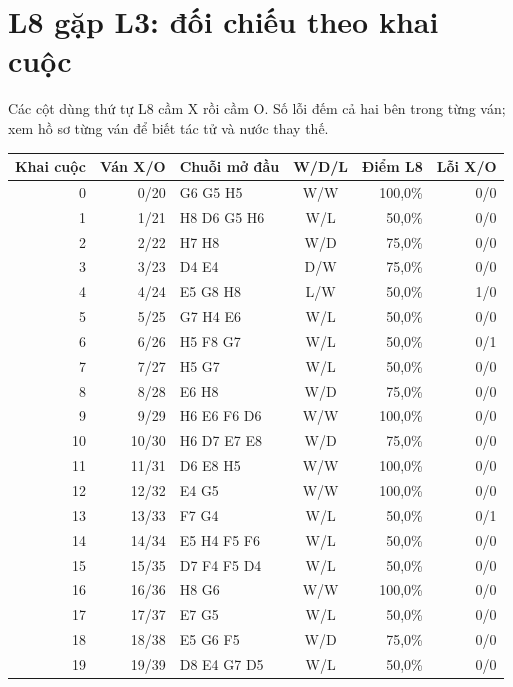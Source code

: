 \section{L8 gặp L3: đối chiếu theo khai cuộc}
Các cột dùng thứ tự L8 cầm X rồi cầm O. Số lỗi đếm cả hai bên trong từng ván; xem hồ sơ từng ván để biết tác tử và nước thay thế.
\begin{center}\small
\begin{tabular}{@{}rrlcrr@{}}
\toprule
Khai cuộc & Ván X/O & Chuỗi mở đầu & W/D/L & Điểm L8 & Lỗi X/O \\
\midrule
0 & 0/20 & G6 G5 H5 & W/W & 100,0\% & 0/0 \\
1 & 1/21 & H8 D6 G5 H6 & W/L & 50,0\% & 0/0 \\
2 & 2/22 & H7 H8 & W/D & 75,0\% & 0/0 \\
3 & 3/23 & D4 E4 & D/W & 75,0\% & 0/0 \\
4 & 4/24 & E5 G8 H8 & L/W & 50,0\% & 1/0 \\
5 & 5/25 & G7 H4 E6 & W/L & 50,0\% & 0/0 \\
6 & 6/26 & H5 F8 G7 & W/L & 50,0\% & 0/1 \\
7 & 7/27 & H5 G7 & W/L & 50,0\% & 0/0 \\
8 & 8/28 & E6 H8 & W/D & 75,0\% & 0/0 \\
9 & 9/29 & H6 E6 F6 D6 & W/W & 100,0\% & 0/0 \\
10 & 10/30 & H6 D7 E7 E8 & W/D & 75,0\% & 0/0 \\
11 & 11/31 & D6 E8 H5 & W/W & 100,0\% & 0/0 \\
12 & 12/32 & E4 G5 & W/W & 100,0\% & 0/0 \\
13 & 13/33 & F7 G4 & W/L & 50,0\% & 0/1 \\
14 & 14/34 & E5 H4 F5 F6 & W/L & 50,0\% & 0/0 \\
15 & 15/35 & D7 F4 F5 D4 & W/L & 50,0\% & 0/0 \\
16 & 16/36 & H8 G6 & W/W & 100,0\% & 0/0 \\
17 & 17/37 & E7 G5 & W/L & 50,0\% & 0/0 \\
18 & 18/38 & E5 G6 F5 & W/D & 75,0\% & 0/0 \\
19 & 19/39 & D8 E4 G7 D5 & W/L & 50,0\% & 0/0 \\
\bottomrule
\end{tabular}
\end{center}